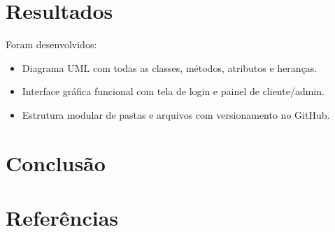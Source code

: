 \documentclass[conference]{IEEEtran}
\begin{document}
\section{Resultados}
Foram desenvolvidos:
\begin{itemize}
    \item Diagrama UML com todas as classes, métodos, atributos e heranças.
    \item Interface gráfica funcional com tela de login e painel de cliente/admin.
    \item Estrutura modular de pastas e arquivos com versionamento no GitHub.
\end{itemize}

\section{Conclusão}


\section {Referências}
\end{document}

